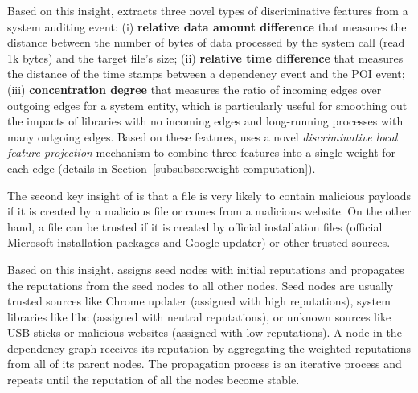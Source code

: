 Based on this insight, \tool extracts three novel types of discriminative features from a system auditing event: (i) \textbf{relative data amount difference} that measures the distance between the number of bytes of data processed by the system call (\eg read 1k bytes) and the target file's size;
(ii) \textbf{relative time difference} that measures the distance of the time stamps between a dependency event and the POI event; 
(iii) \textbf{concentration degree} that measures the ratio of incoming edges over outgoing edges for a system entity, which is particularly useful for smoothing out the impacts of libraries with no incoming edges and long-running processes with many outgoing edges.
Based on these features, \tool uses a novel \emph{discriminative local feature projection} mechanism to combine three features into a single weight for each edge (details in Section~\ref{subsubsec:weight-computation}). 

The second key insight of \tool is that a file is very likely to contain malicious payloads if it is created by a malicious file or comes from a malicious website.
On the other hand, a file can be trusted if it is created by official installation files (\eg official Microsoft installation packages and Google updater) or other trusted sources. 

Based on this insight, \tool assigns seed nodes with initial reputations and propagates the reputations from the seed nodes to all other nodes.
Seed nodes are usually trusted sources like Chrome updater (assigned with high reputations), system libraries like libc (assigned with neutral reputations), or unknown sources like USB sticks or malicious websites (assigned with low reputations). 
A node in the dependency graph receives its reputation by aggregating the weighted reputations from all of its parent nodes.
The propagation process is an iterative process and repeats until the reputation of all the nodes become stable.




